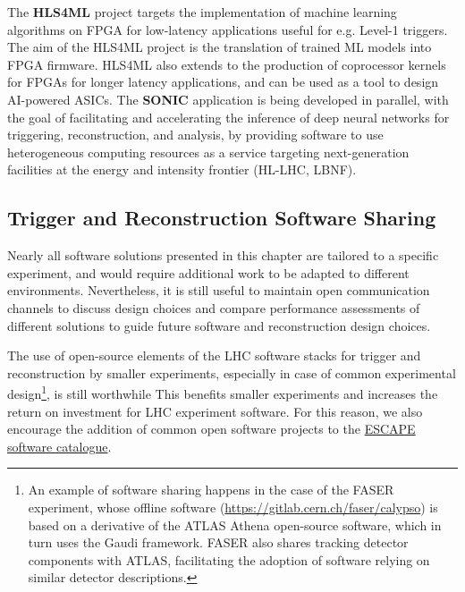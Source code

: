 The \textbf{HLS4ML} project \cite{Duarte:2018ite,Summers:2020xiy,DiGuglielmo:2020eqx} targets the implementation of
machine learning algorithms on FPGA for low-latency applications useful
for e.g. Level-1 triggers. The aim of the HLS4ML project is the
translation of trained ML models into FPGA firmware. HLS4ML also extends
to the production of coprocessor kernels for FPGAs for longer latency
applications, and can be used as a tool to design AI-powered ASICs. The
\textbf{SONIC} application \cite{Duarte:2019fta} is being developed in parallel, with
the goal of facilitating and accelerating the inference of deep neural
networks for triggering, reconstruction, and analysis, by providing
software to use heterogeneous computing resources as a service targeting
next-generation facilities at the energy and intensity frontier (HL-LHC,
LBNF).

\hypertarget{trigger-and-reconstruction-software-sharing}{%
\subsection{Trigger and Reconstruction Software
Sharing}\label{trigger-and-reconstruction-software-sharing}}

Nearly all software solutions presented in this chapter are tailored to
a specific experiment, and would require additional work to be adapted
to different environments. Nevertheless, it is still useful to maintain
open communication channels to discuss design choices and compare
performance assessments of different solutions to guide future software
and reconstruction design choices.

The use of open-source elements of the LHC software stacks for trigger
and reconstruction by smaller experiments, especially in case of common
experimental design\footnote{An example of software sharing happens in
  the case of the FASER experiment, whose offline software
  (\href{https://gitlab.cern.ch/faser/calypso}{{https://gitlab.cern.ch/faser/calypso}})
  is based on a derivative of the ATLAS Athena open-source software, which in turn uses the Gaudi framework. FASER
  also shares tracking detector components with ATLAS, facilitating the
  adoption of software relying on similar detector descriptions.}, is
still worthwhile This benefits smaller experiments
and increases the return on investment for LHC
experiment software. For this reason, we also encourage the addition of
common open software projects to the \href{https://projectescape.eu/services/open-source-scientific-software-and-service-repository}{ESCAPE software catalogue}.
